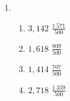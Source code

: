{\begin{multicols}{3}
\begin{enumerate}[noitemsep, label=\textbf{\arabic*}. ]
    \begin{enumerate}[noitemsep, label=\textbf{(\alph*)} ] 
\item $3,142$
\item $1,618$
\item $1,414$
\item $2,718$
    \end{enumerate}

% 
% 
% 
% 
\setcounter{enumi}{8}
\item %

\begin{enumerate}[noitemsep, label=\textbf{(\alph*)} ] 
\item $3,142$ $\frac{1~571}{500}$
\item $1,618$ $\frac{809}{500}$
\item $1,414$ $\frac{707}{500}$
\item $2,718$ $\frac{1~359}{500}$
    \end{enumerate}



\end{enumerate}
\end{multicols}}
